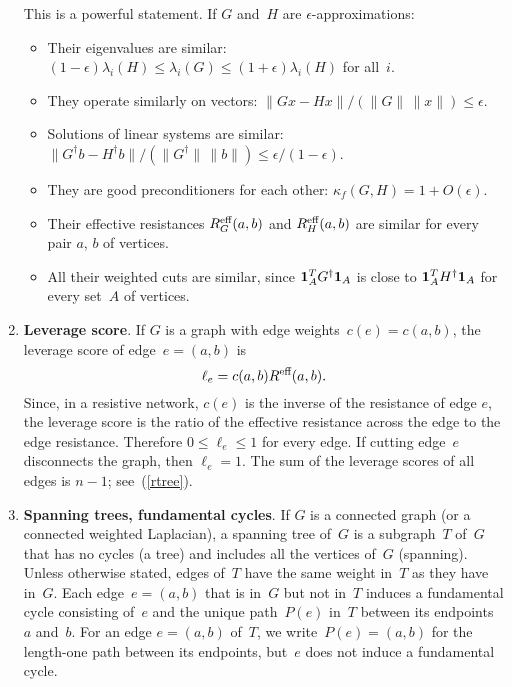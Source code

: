 \documentclass[11pt]{article}
\newcommand{\m}[1]{{\bf{#1}}}       %
\newcommand{\ones}{\m1}             %
\newcommand{\Reff}{R^{\mbox{\scriptsize eff}}}  %
\newcommand{\pinv}{^{\dagger}}          %
\begin{document}
\begin{enumerate}
This is a powerful statement.
If $G$ and~$H$ are $\epsilon$-approximations: 

\begin{itemize}

\item Their eigenvalues are similar: 
$(1-\epsilon)\lambda_i(H)\leq\lambda_i(G)\leq(1+\epsilon)\lambda_i(H)$
for all~$i$.

\item They operate similarly on vectors:
$\|Gx-Hx\|/(\|G\|\,\|x\|) \leq \epsilon$.

\item Solutions of linear systems are similar:
$\|G\pinv b - H\pinv b\|/(\|G\pinv\|\,\|b\|) \leq \epsilon/(1-\epsilon)$.

\item They are good preconditioners for each other:
$\kappa_f(G,H) = 1 + O(\epsilon)$.

\item Their effective resistances $\Reff_G(a,b)$ and $\Reff_H(a,b)$
are similar for every pair $a$, $b$ of vertices.

\item All their weighted cuts are similar, 
since $\ones_A^TG\pinv\ones_A$ is close to $\ones_A^TH\pinv\ones_A$ 
for every set~$A$ of vertices.

\end{itemize}

\item{\bf Leverage score}.
If $G$ is a graph with edge weights~$c(e) = c(a,b)$, 
the leverage score of edge~$e = (a,b)$ is
$$\ell_e=c(a,b)\Reff(a,b).$$
Since, in a resistive network, 
$c(e)$ is the inverse of the resistance  of edge $e$,
the leverage score is the ratio of the effective resistance
across the edge to the edge resistance. 
Therefore $0\leq\ell_e\leq 1$ for every edge.
If cutting edge~$e$ disconnects the graph, then $\ell_e=1$.
The sum of the leverage scores of all edges is $n-1$;
see~(\ref{rtree}).

\item{\bf Spanning trees, fundamental cycles}.\label{stree}
If $G$ is a connected graph (or a connected weighted Laplacian),
a spanning tree of~$G$ is a subgraph~$T$ of~$G$ that has
no cycles (a tree) and includes all the vertices of~$G$ (spanning).
Unless otherwise stated, 
edges of~$T$ have the same weight in~$T$ as they have in~$G$.
Each edge~$e=(a,b)$ that is in~$G$ but not in~$T$ induces a
fundamental cycle consisting of~$e$ and the unique path~$P(e)$
in~$T$ between its endpoints~$a$ and~$b$.
For an edge $e=(a,b)$ of~$T$, we write~$P(e)=(a,b)$ 
for the length-one path between its endpoints, 
but~$e$ does not induce a fundamental cycle.


\end{enumerate}
\end{document}
